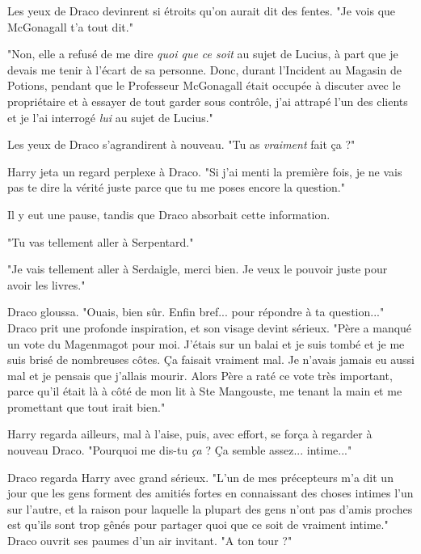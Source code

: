 Les yeux de Draco devinrent si étroits qu'on aurait dit des fentes. "Je vois que McGonagall t'a tout dit."

"Non, elle a refusé de me dire \emph{quoi que ce soit}  au sujet de Lucius, à part que je devais me tenir à l'écart de sa personne. Donc, durant l'Incident au Magasin de Potions, pendant que le Professeur McGonagall était occupée à discuter avec le propriétaire et à essayer de tout garder sous contrôle, j'ai attrapé l'un des clients et je l'ai interrogé \emph{lui}  au sujet de Lucius."

Les yeux de Draco s'agrandirent à nouveau. "Tu as \emph{vraiment}  fait ça ?"

Harry jeta un regard perplexe à Draco. "Si j'ai menti la première fois, je ne vais pas te dire la vérité juste parce que tu me poses encore la question."

Il y eut une pause, tandis que Draco absorbait cette information.

"Tu vas tellement aller à Serpentard."

"Je vais tellement aller à Serdaigle, merci bien. Je veux le pouvoir juste pour avoir les livres."

Draco gloussa. "Ouais, bien sûr. Enfin bref... pour répondre à ta question..." Draco prit une profonde inspiration, et son visage devint sérieux. "Père a manqué un vote du Magenmagot pour moi. J'étais sur un balai et je suis tombé et je me suis brisé de nombreuses côtes. Ça faisait vraiment mal. Je n'avais jamais eu aussi mal et je pensais que j'allais mourir. Alors Père a raté ce vote très important, parce qu'il était là à côté de mon lit à Ste Mangouste, me tenant la main et me promettant que tout irait bien."

Harry regarda ailleurs, mal à l'aise, puis, avec effort, se força à regarder à nouveau Draco. "Pourquoi me dis-tu \emph{ça}  ? Ça semble assez... intime..."

Draco regarda Harry avec grand sérieux. "L'un de mes précepteurs m'a dit un jour que les gens forment des amitiés fortes en connaissant des choses intimes l'un sur l'autre, et la raison pour laquelle la plupart des gens n'ont pas d'amis proches est qu'ils sont trop gênés pour partager quoi que ce soit de vraiment intime." Draco ouvrit ses paumes d'un air invitant. "A ton tour ?"

